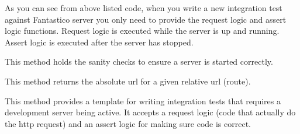 \documentclass[letterpaper,10pt,english]{sphinxmanual}
\begin{document}
\begin{fulllineitems}
As you can see from above listed code, when you write a new integration test against Fantastico server you only need
to provide the request logic and assert logic functions. Request logic is executed while the server is up and running.
Assert logic is executed after the server has stopped.

\begin{fulllineitems}
\label{get_started/contribute:fantastico.server.tests.itest_dev_server.DevServerIntegration._check_server_started}
This method holds the sanity checks to ensure a server is started correctly.

\end{fulllineitems}


\begin{fulllineitems}
\label{get_started/contribute:fantastico.server.tests.itest_dev_server.DevServerIntegration._get_server_base_url}
This method returns the absolute url for a given relative url (route).

\end{fulllineitems}


\begin{fulllineitems}
\label{get_started/contribute:fantastico.server.tests.itest_dev_server.DevServerIntegration._run_test_against_dev_server}
This method provides a template for writing integration tests that requires a development server being active.
It accepts a request logic (code that actually do the http request) and an assert logic for making sure
code is correct.

\end{fulllineitems}


\end{fulllineitems}
\end{document}
